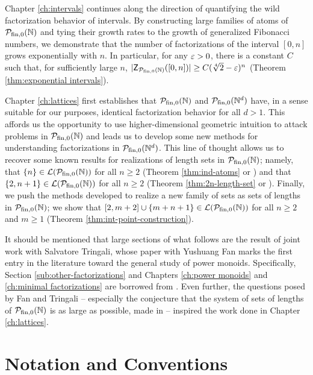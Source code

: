 Chapter \ref{ch:intervals} continues along the direction of quantifying the wild factorization behavior of intervals.
By constructing large families of atoms of ${\mathcal{P}_{\textrm{fin},0}(\mathbb{N})}$ and tying their growth rates to the growth of generalized Fibonacci numbers, we demonstrate that the number of factorizations of the interval $[0,n]$ grows exponentially with $n$.
In particular, for any $\varepsilon>0$, there is a constant $C$ such that, for sufficiently large $n$, $|\mathsf{Z}_{\mathcal{P}_{\textrm{fin},0}(\mathbb{N})}([0,n])| \ge C(\sqrt[4]{2}-\varepsilon)^n$ (Theorem \ref{thm:exponential intervals}).

Chapter \ref{ch:lattices} first establishes that ${\mathcal{P}_{\textrm{fin},0}(\mathbb{N})}$ and $\mathcal{P}_{\textrm{fin}, 0}(\mathbb{N}^d)$ have, in a sense suitable for our purposes, identical factorization behavior for all $d>1$.
This affords us the opportunity to use higher-dimensional geometric intuition to attack problems in ${\mathcal{P}_{\textrm{fin},0}(\mathbb{N})}$ and leads us to develop some new methods for understanding factorizations in $\mathcal{P}_{\textrm{fin}, 0}(\mathbb{N}^d)$.
This line of thought allows us to recover some known results for realizations of length sets in ${\mathcal{P}_{\textrm{fin},0}(\mathbb{N})}$; namely, that $\{n\} \in\mathcal{L}({\mathcal{P}_{\textrm{fin},0}(\mathbb{N})})$ for all $n\ge 2$ (Theorem \ref{thm:ind-atoms} or  \cite[Proposition 4.9]{fan-tringali18}) and that $\{2,n+1\}\in \mathcal{L}({\mathcal{P}_{\textrm{fin},0}(\mathbb{N})})$ for all $n\ge 2$ (Theorem \ref{thm:2n-length-set} or \cite[Proposition 4.10]{fan-tringali18}).
Finally, we push the methods developed to realize a new family of sets as sets of lengths in ${\mathcal{P}_{\textrm{fin},0}(\mathbb{N})}$; we show that $[2,m+2]\cup\{m+n+1\}\in \mathcal{L}({\mathcal{P}_{\textrm{fin},0}(\mathbb{N})})$ for all $n\ge 2$ and $m\ge 1$ (Theorem \ref{thm:int-point-construction}).

It should be mentioned that large sections of what follows are the result of joint work with Salvatore Tringali, whose paper \cite{fan-tringali18} with Yushuang Fan marks the first entry in the literature toward the general study of power monoids.
Specifically, Section \ref{sub:other-factorizations} and Chapters \ref{ch:power monoids} and \ref{ch:minimal factorizations} are borrowed from \cite{antoniou-tringali19}.  
Even further, the questions posed by Fan and Tringali -- especially the conjecture that the system of sets of lengths of ${\mathcal{P}_{\textrm{fin},0}(\mathbb{N})}$ is as large as possible, made in \cite[Section 5]{fan-tringali18} -- inspired the work done in Chapter \ref{ch:lattices}.



\section{Notation and Conventions} \label{subsec:generalities}

